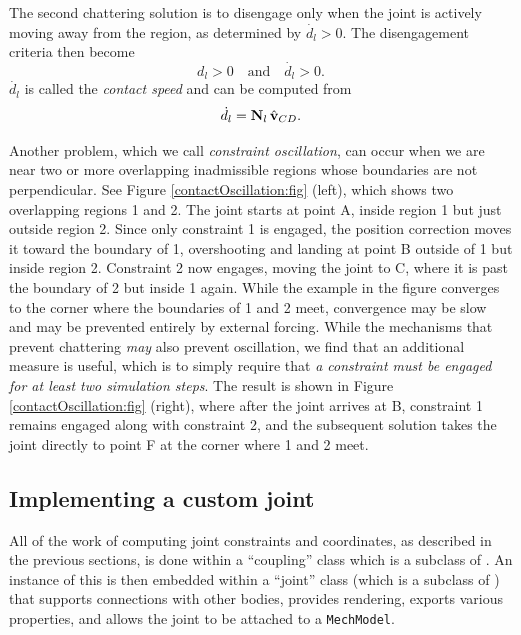 The second chattering solution is to disengage only when the joint is
actively moving away from the region, as determined by $\dot{d_l} > 0$.
The disengagement criteria then become
%
\begin{equation}
d_l > 0 \quad \text{and} \quad \dot{d_l} > 0.
\label{disengage:eqn}
\end{equation}
%
$\dot{d_l}$ is called the {\it contact speed} and can be computed from
%
\begin{equation}
\dot{d_l} = {\bf N}_l \, \hat{{\bf v}}_{CD}.
\end{equation}
%

Another problem, which we call {\it constraint oscillation}, can occur
when we are near two or more overlapping inadmissible regions whose
boundaries are not perpendicular.  See
Figure \ref{contactOscillation:fig} (left), which shows two
overlapping regions 1 and 2. The joint starts at point A, inside
region 1 but just outside region 2. Since only constraint 1 is
engaged, the position correction moves it toward the boundary of 1,
overshooting and landing at point B outside of 1 but inside region 2.
Constraint 2 now engages, moving the joint to C, where it is past the
boundary of 2 but inside 1 again. While the example in the figure
converges to the corner where the boundaries of 1 and 2 meet,
convergence may be slow and may be prevented entirely by external
forcing. While the mechanisms that prevent chattering {\it may} also
prevent oscillation, we find that an additional measure is useful,
which is to simply require that {\it a constraint must be engaged for
at least two simulation steps}. The result is shown in
Figure \ref{contactOscillation:fig} (right), where after the joint
arrives at B, constraint 1 remains engaged along with constraint 2,
and the subsequent solution takes the joint directly to point F at the
corner where 1 and 2 meet.

\subsection{Implementing a custom joint}
\label{CustomJointImplementation:sec}

All of the work of computing joint constraints and coordinates, as
described in the previous sections, is done within a ``coupling''
class which is a subclass of
.
An instance of this is then embedded within a ``joint'' class 
(which is a subclass of
)
that supports connections with other bodies, provides rendering,
exports various properties, and allows the joint to be attached to a
{\tt MechModel}.

